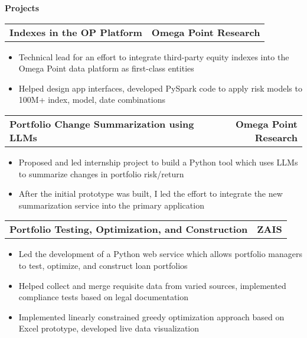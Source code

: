 \documentclass[letterpaper,10pt]{article}
\newcommand{\myitem}{\item[$\triangleright$]}
\newcommand{\resHeading}[1]{{
		\begin{tcolorbox}[size=title, sharp corners, colback=mygrey, colframe=mygrey]
			\centering\textbf{\large #1}
		\end{tcolorbox}
	}}
\newcommand{\twoColSubHeading}[2]{
		\begin{tabularx}{\columnwidth}{Xr}
				\textbf{#1} & \textbf{#2}
		\end{tabularx}
	}
\newcommand{\threeColSubHeading}[3]{
		\begin{tabularx}{\textwidth}{XcX}
				\textbf{#1} & \textit{\textbf{#2}}  & \hfill\textbf{#3}
		\end{tabularx}
	}
\begin{document}
	\resHeading{Projects}
		\twoColSubHeading{Indexes in the OP Platform}{Omega Point Research}
		\begin{itemize}
			\myitem Technical lead for an effort to integrate third-party equity indexes into the Omega Point data platform as first-class entities
			\myitem Helped design app interfaces, developed PySpark code to apply risk models to 100M+ index, model, date combinations
		\end{itemize}
		\twoColSubHeading{Portfolio Change Summarization using LLMs}{Omega Point Research}
		\begin{itemize}
			\myitem Proposed and led internship project to build a Python tool which uses LLMs to summarize changes in portfolio risk/return
			\myitem After the initial prototype was built, I led the effort to integrate the new summarization service into the primary application
		\end{itemize}
		\twoColSubHeading{Portfolio Testing, Optimization, and Construction}{ZAIS}
		\begin{itemize}
			\myitem Led the development of a Python web service which allows portfolio managers to test, optimize, and construct loan portfolios
			\myitem Helped collect and merge requisite data from varied sources, implemented compliance tests based on legal documentation
			\myitem Implemented linearly constrained greedy optimization approach based on Excel prototype, developed live data visualization
		\end{itemize}
\end{document}
